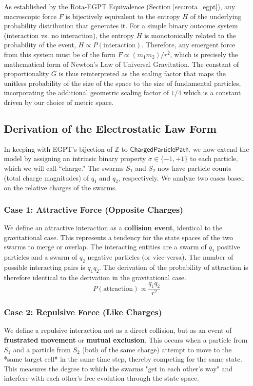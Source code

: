 \documentclass[11pt, letterpaper]{article}
\begin{document}
As established by the Rota-EGPT Equivalence (Section \ref{sec:rota_egpt}), any macroscopic force $F$ is bijectively equivalent to the entropy $H$ of the underlying probability distribution that generates it. For a simple binary outcome system (interaction vs. no interaction), the entropy $H$ is monotonically related to the probability of the event, $H \propto P(\text{interaction})$. Therefore, any emergent force from this system must be of the form $F \propto (m_1 m_2) / r^2$, which is precisely the mathematical form of Newton's Law of Universal Gravitation. The constant of proportionality $G$ is thus reinterpreted as the scaling factor that maps the unitless probability of the size of the space to the size of fundamental particles, incorporating the additional geometric scaling factor of $1/4$ which is a constant driven by our choice of metric space.

\subsection{Derivation of the Electrostatic Law Form}

In keeping with EGPT's bijection of $\mathbb{Z}$ to $\mathsf{ChargedParticlePath}$, we now extend the model by assigning an intrinsic binary property $\sigma \in \{-1, +1\}$ to each particle, which we will call ``charge.'' The swarms $S_1$ and $S_2$ now have particle counts (total charge magnitudes) of $q_1$ and $q_2$, respectively. We analyze two cases based on the relative charges of the swarms.

\subsubsection{Case 1: Attractive Force (Opposite Charges)}
We define an attractive interaction as a \textbf{collision event}, identical to the gravitational case. This represents a tendency for the state spaces of the two swarms to merge or overlap. The interacting entities are a swarm of $q_1$ positive particles and a swarm of $q_2$ negative particles (or vice-versa). The number of possible interacting pairs is $q_1 q_2$. The derivation of the probability of attraction is therefore identical to the derivation in the gravitational case.
\begin{equation} \label{eq:coulomb_attract}
P(\text{attraction}) \propto \frac{q_1 q_2}{r^2}
\end{equation}

\subsubsection{Case 2: Repulsive Force (Like Charges)}
We define a repulsive interaction not as a direct collision, but as an event of \textbf{frustrated movement} or \textbf{mutual exclusion}. This occurs when a particle from $S_1$ and a particle from $S_2$ (both of the same charge) attempt to move to the *same target cell* in the same time step, thereby competing for the same state. This measures the degree to which the swarms "get in each other's way" and interfere with each other's free evolution through the state space.
\end{document}
